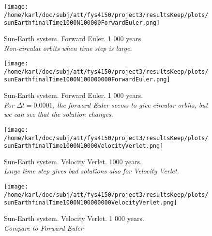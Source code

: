 \documentclass{article}
\begin{document}
\begin{minipage}{.49\textwidth} 
	\begin{figure}[H]
		\centering
		\texttt{[image: /home/karl/doc/subj/att/fys4150/project3/resultsKeep/plots/sunEarthfinalTime1000N100000ForwardEuler.png]}
		\caption{Sun-Earth system. Forward Euler. 1 000 years \\ \textit{Non-circulat orbits when time step is large.}}
		\label{1}
	\end{figure}
\end{minipage}\hfill
\begin{minipage}{.49\textwidth} 
	\begin{figure}[H]
		\centering
		\texttt{[image: /home/karl/doc/subj/att/fys4150/project3/resultsKeep/plots/sunEarthfinalTime1000N100000000ForwardEuler.png]}
		\caption{Sun-Earth system. Forward Euler. 1 000 years. \\ \textit{For $\Delta t = 0.0001$, the forward Euler seems to give circular orbits, but we can see that the solution changes.}}
		\label{1}
	\end{figure}
\end{minipage}\hfill
\vspace{2ex}



\begin{minipage}{.49\textwidth} 
	\begin{figure}[H]
		\centering
		\texttt{[image: /home/karl/doc/subj/att/fys4150/project3/resultsKeep/plots/sunEarthfinalTime1000N10000VelocityVerlet.png]}
		\caption{Sun-Earth system. Velocity Verlet. 1000 years. \\ \textit{Large time step gives bad solutions also for Velocity Verlet.}}
		\label{1}
	\end{figure}
\end{minipage}\hfill
\begin{minipage}{.49\textwidth} 
	\begin{figure}[H]
		\centering
		\texttt{[image: /home/karl/doc/subj/att/fys4150/project3/resultsKeep/plots/sunEarthfinalTime1000N100000000VelocityVerlet.png]}
		\caption{Sun-Earth system. Velocity Verlet. 1 000 years. \\ \textit{Compare to Forward Euler}}
		\label{1}
	\end{figure}
\end{minipage}\hfill
\vspace{2ex}
\end{document}
